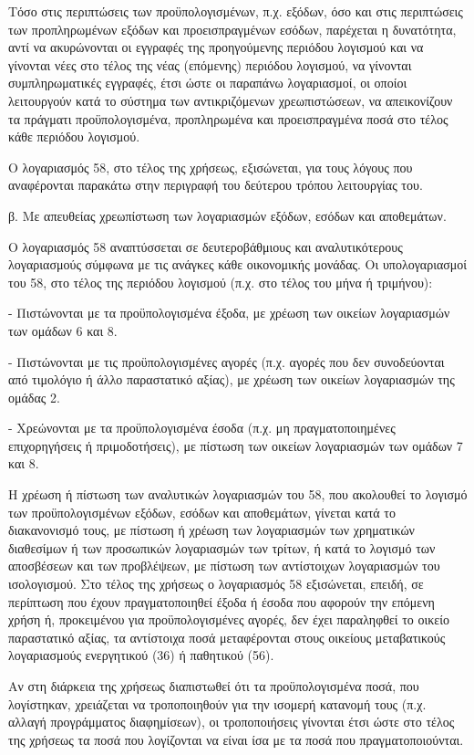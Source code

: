 \documentclass[A4,10pt,greek]{book}
\begin{document}
Τόσο στις περιπτώσεις των προϋπολογισμένων, π.χ. εξόδων, όσο και στις περιπτώσεις των προπληρωμένων εξόδων και προεισπραγμένων εσόδων, παρέχεται η δυνατότητα, αντί να ακυρώνονται οι εγγραφές της προηγούμενης περιόδου λογισμού και να γίνονται νέες στο τέλος της νέας (επόμενης) περιόδου λογισμού, να γίνονται συμπληρωματικές εγγραφές, έτσι ώστε οι παραπάνω λογαριασμοί, οι οποίοι λειτουργούν κατά το σύστημα των αντικριζόμενων χρεωπιστώσεων, να απεικονίζουν τα πράγματι προϋπολογισμένα, προπληρωμένα και προεισπραγμένα ποσά στο τέλος κάθε περιόδου λογισμού.

Ο λογαριασμός 58, στο τέλος της χρήσεως, εξισώνεται, για τους λόγους που αναφέρονται παρακάτω στην περιγραφή του δεύτερου τρόπου λειτουργίας του.

β. Με απευθείας χρεωπίστωση των λογαριασμών εξόδων, εσόδων και αποθεμάτων.

Ο λογαριασμός 58 αναπτύσσεται σε δευτεροβάθμιους και αναλυτικότερους λογαριασμούς σύμφωνα με τις ανάγκες κάθε οικονομικής μονάδας. Οι υπολογαριασμοί του 58, στο τέλος της περιόδου λογισμού (π.χ. στο τέλος του μήνα ή τριμήνου):

- Πιστώνονται με τα προϋπολογισμένα έξοδα, με χρέωση των οικείων λογαριασμών των ομάδων 6 και 8.

- Πιστώνονται με τις προϋπολογισμένες αγορές (π.χ. αγορές που δεν συνοδεύονται από τιμολόγιο ή άλλο παραστατικό αξίας), με χρέωση των οικείων λογαριασμών της ομάδας 2.

- Χρεώνονται με τα προϋπολογισμένα έσοδα (π.χ. μη πραγματοποιημένες επιχορηγήσεις ή πριμοδοτήσεις), με πίστωση των οικείων λογαριασμών των ομάδων 7 και 8.

Η χρέωση ή πίστωση των αναλυτικών λογαριασμών του 58, που ακολουθεί το λογισμό των προϋπολογισμένων εξόδων, εσόδων και αποθεμάτων, γίνεται κατά το διακανονισμό τους, με πίστωση ή χρέωση των λογαριασμών των χρηματικών διαθεσίμων ή των προσωπικών λογαριασμών των τρίτων, ή κατά το λογισμό των αποσβέσεων και των προβλέψεων, με πίστωση των αντίστοιχων λογαριασμών του ισολογισμού. Στο τέλος της χρήσεως ο λογαριασμός 58 εξισώνεται, επειδή, σε περίπτωση που έχουν πραγματοποιηθεί έξοδα ή έσοδα που αφορούν την επόμενη χρήση ή, προκειμένου για προϋπολογισμένες αγορές, δεν έχει παραληφθεί το οικείο παραστατικό αξίας, τα αντίστοιχα ποσά μεταφέρονται στους οικείους μεταβατικούς λογαριασμούς ενεργητικού (36) ή παθητικού (56).

Αν στη διάρκεια της χρήσεως διαπιστωθεί ότι τα προϋπολογισμένα ποσά, που λογίστηκαν, χρειάζεται να τροποποιηθούν για την ισομερή κατανομή τους (π.χ.  αλλαγή προγράμματος διαφημίσεων), οι τροποποιήσεις γίνονται έτσι ώστε στο τέλος της χρήσεως τα ποσά που λογίζονται να είναι ίσα με τα ποσά που πραγματοποιούνται.
\end{document}
